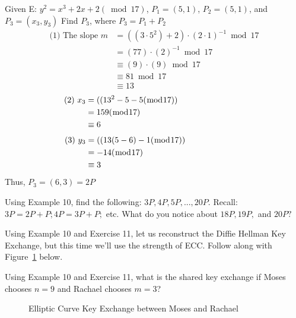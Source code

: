 \begin{eg} Given E: $y^2 = x^3 + 2x + 2 (\bmod17)$, $P_1 = (5,1)$, $P_2 = (5,1)$, and $P_3 = (x_3, y_3)$
	Find $P_3$, where $P_3 = P_1 + P_2$
		\begin{align*}
		\textrm{(1) The slope~} m
		 &= ( (3 \cdot 5^2) + 2) \cdot (2 \cdot 1)^{-1} \bmod 17\\
	          &= (77) \cdot (2)^{-1} \bmod 17\\
                     &\equiv (9) \cdot (9) \bmod 17\\
                     &\equiv 81 \bmod 17\\
                    &\equiv 13
		\end{align*}
		\begin{align*}
		\textrm{(2)~}x_3
		 &= ( (13^2 - 5 - 5  (\bmod 17)) \text{\qquad \qquad \qquad \quad \: \: }\\
	          &= 159(\bmod 17)\\
                     &\equiv 6
		\end{align*}
			\begin{align*}
		\textrm{(3)~}y_3
		 &= ( (13(5 - 6) - 1(\bmod 17)) \text{\qquad \qquad \qquad \quad }\\
	          &= -14(\bmod 17)\\
                     &\equiv 3
		\end{align*}
Thus, $P_3 = (6,3) = 2P$
\end{eg}
\begin {exer}
Using Example 10, find the following: $3P, 4P, 5P, ..., 20P.$  Recall: $3P = 2P + P;  4P = 3P +P;$ etc.  What do you notice about $18P,  19P,$ and $20P?$
\end{exer}
\begin{eg}
Using Example 10 and Exercise 11, let us reconstruct the Diffie Hellman Key Exchange, but this time we'll use the strength of ECC.  Follow along with Figure~\ref{fig:DH:DHKE_8} below.
\end{eg}
\begin{exer}
Using Example 10 and Exercise 11, what is the shared key exchange if Moses chooses $n = 9$ and Rachael chooses $m = 3$?
\end{exer}
\begin{figure}[H]
	  \caption{\label{fig:DH:DHKE_8} Elliptic Curve Key Exchange between Moses and Rachael }
\end{figure}


